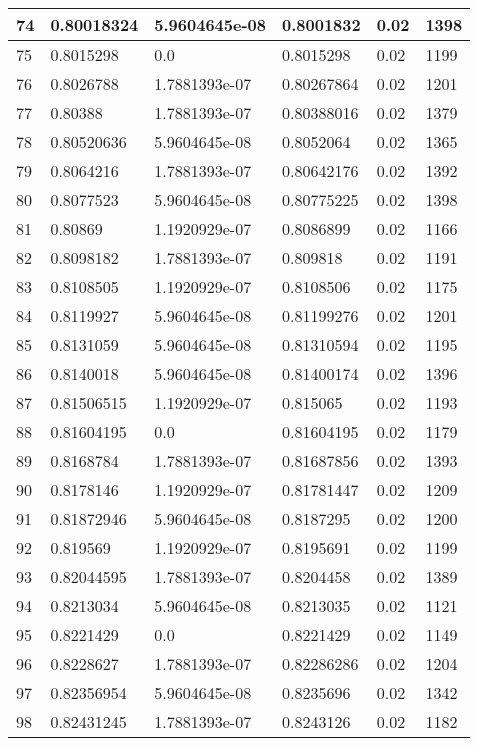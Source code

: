 \begin{longtable}{|l|l|l|l|l|l|}
74 & 0.80018324 & 5.9604645e-08 & 0.8001832 & 0.02 & 1398 \\ \hline 
75 & 0.8015298 & 0.0 & 0.8015298 & 0.02 & 1199 \\ \hline 
76 & 0.8026788 & 1.7881393e-07 & 0.80267864 & 0.02 & 1201 \\ \hline 
77 & 0.80388 & 1.7881393e-07 & 0.80388016 & 0.02 & 1379 \\ \hline 
78 & 0.80520636 & 5.9604645e-08 & 0.8052064 & 0.02 & 1365 \\ \hline 
79 & 0.8064216 & 1.7881393e-07 & 0.80642176 & 0.02 & 1392 \\ \hline 
80 & 0.8077523 & 5.9604645e-08 & 0.80775225 & 0.02 & 1398 \\ \hline 
81 & 0.80869 & 1.1920929e-07 & 0.8086899 & 0.02 & 1166 \\ \hline 
82 & 0.8098182 & 1.7881393e-07 & 0.809818 & 0.02 & 1191 \\ \hline 
83 & 0.8108505 & 1.1920929e-07 & 0.8108506 & 0.02 & 1175 \\ \hline 
84 & 0.8119927 & 5.9604645e-08 & 0.81199276 & 0.02 & 1201 \\ \hline 
85 & 0.8131059 & 5.9604645e-08 & 0.81310594 & 0.02 & 1195 \\ \hline 
86 & 0.8140018 & 5.9604645e-08 & 0.81400174 & 0.02 & 1396 \\ \hline 
87 & 0.81506515 & 1.1920929e-07 & 0.815065 & 0.02 & 1193 \\ \hline 
88 & 0.81604195 & 0.0 & 0.81604195 & 0.02 & 1179 \\ \hline 
89 & 0.8168784 & 1.7881393e-07 & 0.81687856 & 0.02 & 1393 \\ \hline 
90 & 0.8178146 & 1.1920929e-07 & 0.81781447 & 0.02 & 1209 \\ \hline 
91 & 0.81872946 & 5.9604645e-08 & 0.8187295 & 0.02 & 1200 \\ \hline 
92 & 0.819569 & 1.1920929e-07 & 0.8195691 & 0.02 & 1199 \\ \hline 
93 & 0.82044595 & 1.7881393e-07 & 0.8204458 & 0.02 & 1389 \\ \hline 
94 & 0.8213034 & 5.9604645e-08 & 0.8213035 & 0.02 & 1121 \\ \hline 
95 & 0.8221429 & 0.0 & 0.8221429 & 0.02 & 1149 \\ \hline 
96 & 0.8228627 & 1.7881393e-07 & 0.82286286 & 0.02 & 1204 \\ \hline 
97 & 0.82356954 & 5.9604645e-08 & 0.8235696 & 0.02 & 1342 \\ \hline 
98 & 0.82431245 & 1.7881393e-07 & 0.8243126 & 0.02 & 1182 \\ \hline 

\end{longtable}
